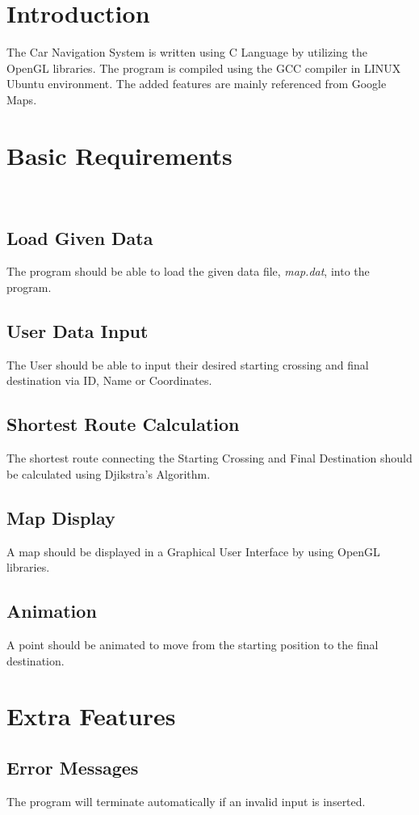\documentclass[12pt]{article}
\begin{document}
\maketitle
\newpage

\section{Introduction}
The Car Navigation System is written using C Language by utilizing the OpenGL libraries. The program is compiled using the GCC compiler in LINUX Ubuntu environment.
The added features are mainly referenced from Google Maps.

\section{Basic Requirements}\
\subsection {Load Given Data}
The program should be able to load the given data file, {\it map.dat}, into the program. 
\subsection {User Data Input} 
The User should be able to input their desired starting crossing and final destination via ID, Name or Coordinates.
\subsection {Shortest Route Calculation}
The shortest route connecting the Starting Crossing and Final Destination should be calculated using Djikstra's Algorithm.
\subsection {Map Display}
A map should be displayed in a Graphical User Interface by using OpenGL libraries.
\subsection {Animation}
A point should be animated to move from the starting position to the final destination.
\newpage
\section{Extra Features}
\subsection{Error Messages}
The program will terminate automatically if an invalid input is inserted.
\end{document}
